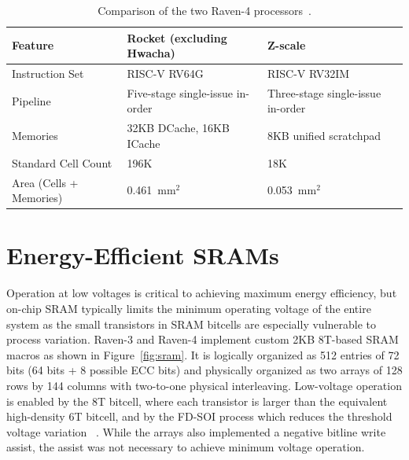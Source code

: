 \documentclass[graybox]{svmult}
\begin{document}
\begin{table}[]
\footnotesize
\renewcommand{\arraystretch}{1.2}
\centering
\begin{tabular}{@{}lll@{}}
\toprule
\textbf{Feature} & \textbf{Rocket (excluding Hwacha)} & \textbf{Z-scale} \\
\midrule
{Instruction Set} & RISC-V RV64G & RISC-V RV32IM\\
{Pipeline} & Five-stage single-issue in-order & Three-stage single-issue in-order\\
{Memories} & 32KB DCache, 16KB ICache & 8KB unified scratchpad \\
{Standard Cell Count} & 196K & 18K \\
{Area (Cells + Memories)} & \SI{0.461}{\milli\meter}$^2$ & \SI{0.053}{\milli\meter}$^2$ \\
\bottomrule
\end{tabular}
\caption{Comparison of the two Raven-4 processors~\cite{Keller2017}.}
\label{tab:raven4-processors}
\end{table}




\section{Energy-Efficient SRAMs}

Operation at low voltages is critical to achieving maximum energy efficiency, but on-chip SRAM typically limits the minimum operating voltage of the entire system as the small transistors in SRAM bitcells are especially vulnerable to process variation.
Raven-3 and Raven-4 implement custom 2KB 8T-based SRAM macros as shown in Figure~\ref{fig:sram}.
It is logically organized as 512 entries of 72 bits (64 bits + 8 possible ECC bits) and physically organized as two arrays of 128 rows by 144 columns with two-to-one physical interleaving.
Low-voltage operation is enabled by the 8T bitcell, where each transistor is larger than the equivalent high-density 6T bitcell, and by the FD-SOI process which reduces the threshold voltage variation \cite{planes}~\cite{raven1}.
While the arrays also implemented a negative bitline write assist, the assist was not necessary to achieve minimum voltage operation.
\end{document}
